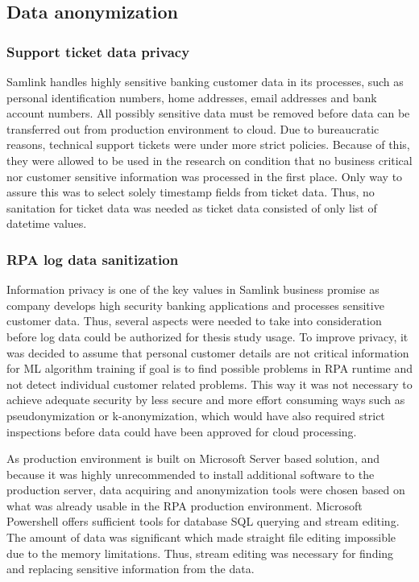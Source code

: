 
\subsection{Data anonymization}\label{subsec:meth-data-anonymization}

\subsubsection*{Support ticket data privacy}
Samlink handles highly sensitive banking customer data in its processes,
such as personal identification numbers, home addresses, email addresses and bank account numbers.
All possibly sensitive data must be removed
before data can be transferred out from production environment to cloud.
Due to bureaucratic reasons,
technical support tickets were under more strict policies.
Because of this,
they were allowed to be used in the research
on condition that no business critical nor customer sensitive information
was processed in the first place.
Only way to assure this
was to select solely timestamp fields from ticket data.
Thus, no sanitation for ticket data was needed
as ticket data consisted of only list of datetime values.

\subsubsection*{RPA log data sanitization}
Information privacy is one of the key values in Samlink business promise
as company develops high security banking applications
and processes sensitive customer data.
Thus, several aspects were needed to take into consideration
before log data could be authorized for thesis study usage.
To improve privacy,
it was decided to assume
that personal customer details are not critical information
for ML algorithm training
if goal is to find possible problems in RPA runtime
and not detect individual customer related problems.
This way it was not necessary to achieve adequate security
by less secure and more effort consuming ways
such as pseudonymization or k-anonymization,
which would have also required strict inspections
before data could have been approved for cloud processing.

As production environment is built on Microsoft Server based solution,
and because it was highly unrecommended
to install additional software to the production server,
data acquiring and anonymization tools were chosen
based on what was already usable in the RPA production environment.
Microsoft Powershell offers sufficient tools
for database SQL querying
and stream editing.
The amount of data was significant
which made straight file editing impossible
due to the memory limitations.
Thus, stream editing was necessary
for finding and replacing
sensitive information from the data.

